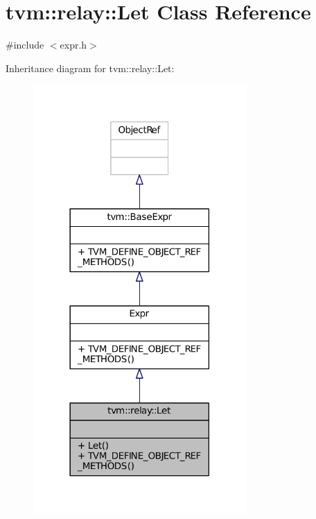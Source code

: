 \hypertarget{classtvm_1_1relay_1_1Let}{}\section{tvm\+:\+:relay\+:\+:Let Class Reference}
\label{classtvm_1_1relay_1_1Let}


{\ttfamily \#include $<$expr.\+h$>$}



Inheritance diagram for tvm\+:\+:relay\+:\+:Let\+:
\nopagebreak
\begin{figure}[H]
\begin{center}
\leavevmode
\includegraphics[width=230pt]{classtvm_1_1relay_1_1Let__inherit__graph}
\end{center}
\end{figure}


